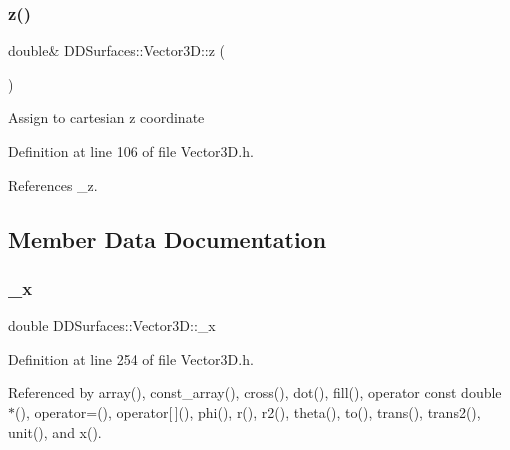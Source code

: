 \hypertarget{class_d_d_surfaces_1_1_vector3_d_a3318b2914eff5012a878d22c373e9e08}{}\label{class_d_d_surfaces_1_1_vector3_d_a3318b2914eff5012a878d22c373e9e08} 
\subsubsection{\texorpdfstring{z()}{z()}\hspace{0.1cm}{\footnotesize\ttfamily [2/2]}}
{\footnotesize\ttfamily double\& D\+D\+Surfaces\+::\+Vector3\+D\+::z (\begin{DoxyParamCaption}{ }\end{DoxyParamCaption})\hspace{0.3cm}{\ttfamily [inline]}}

Assign to cartesian z coordinate 

Definition at line 106 of file Vector3\+D.\+h.



References \+\_\+z.



\subsection{Member Data Documentation}
\hypertarget{class_d_d_surfaces_1_1_vector3_d_a9891648fe605155ece38f3b9c9dd687d}{}\label{class_d_d_surfaces_1_1_vector3_d_a9891648fe605155ece38f3b9c9dd687d} 
\subsubsection{\texorpdfstring{\+\_\+x}{\_x}}
{\footnotesize\ttfamily double D\+D\+Surfaces\+::\+Vector3\+D\+::\+\_\+x\hspace{0.3cm}{\ttfamily [protected]}}



Definition at line 254 of file Vector3\+D.\+h.



Referenced by array(), const\+\_\+array(), cross(), dot(), fill(), operator const double $\ast$(), operator=(), operator\mbox{[}$\,$\mbox{]}(), phi(), r(), r2(), theta(), to(), trans(), trans2(), unit(), and x().

\hypertarget{class_d_d_surfaces_1_1_vector3_d_a69ad9a281ca55cd4b1e9959265855a97}{}\label{class_d_d_surfaces_1_1_vector3_d_a69ad9a281ca55cd4b1e9959265855a97} 
